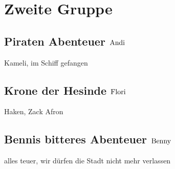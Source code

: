 \chapter{Zweite Gruppe}
\section{Piraten Abenteuer \hfill $\rm{Andi}$}
Kameli, im Schiff gefangen
\section{Krone der Hesinde \hfill $\rm{Flori}$}
Haken, Zack Afron
\section{Bennis bitteres Abenteuer \hfill $\rm{Benny}$}
alles teuer, wir dürfen die Stadt nicht mehr verlassen